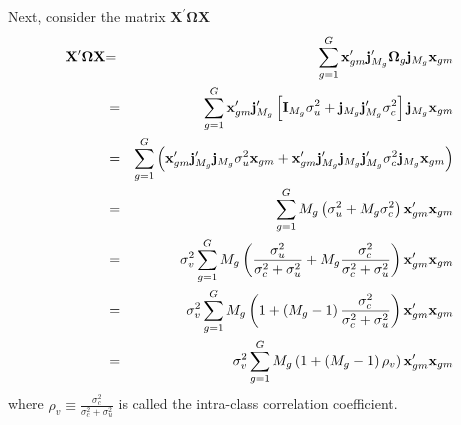 \documentclass{article}
\begin{document}
Next, consider the matrix $\mathbf{X}^{\prime }\mathbf{\Omega X}$%
\begin{eqnarray}
\mathbf{X}^{\prime }\mathbf{\Omega X} &\mathbf{=}&\sum_{g=1}^{G}\mathbf{x}%
_{gm}^{\prime }\mathbf{j}_{M_{g}}^{\prime }\mathbf{\Omega }_{g}\mathbf{j}%
_{M_{g}}\mathbf{x}_{gm}  \notag \\
&=&\sum_{g=1}^{G}\mathbf{x}_{gm}^{\prime }\mathbf{j}_{M_{g}}^{\prime }\left[ 
\mathbf{I}_{M_{g}}\sigma _{u}^{2}+\mathbf{j}_{M_{g}}\mathbf{j}%
_{M_{g}}^{\prime }\sigma _{c}^{2}\right] \mathbf{j}_{M_{g}}\mathbf{x}_{gm} 
\notag \\
&=&\sum_{g=1}^{G}\left( \mathbf{x}_{gm}^{\prime }\mathbf{j}_{M_{g}}^{\prime }%
\mathbf{j}_{M_{g}}\sigma _{u}^{2}\mathbf{x}_{gm}+\mathbf{x}_{gm}^{\prime }%
\mathbf{j}_{M_{g}}^{\prime }\mathbf{j}_{M_{g}}\mathbf{j}_{M_{g}}^{\prime
}\sigma _{c}^{2}\mathbf{j}_{M_{g}}\mathbf{x}_{gm}\right)  \notag \\
&=&\sum_{g=1}^{G}M_{g}\left( \sigma _{u}^{2}+M_{g}\sigma _{c}^{2}\right) 
\mathbf{x}_{gm}^{\prime }\mathbf{x}_{gm}  \notag \\
&=&\sigma _{v}^{2}\sum_{g=1}^{G}M_{g}\left( \frac{\sigma _{u}^{2}}{\sigma
_{c}^{2}+\sigma _{u}^{2}}+M_{g}\frac{\sigma _{c}^{2}}{\sigma _{c}^{2}+\sigma
_{u}^{2}}\right) \mathbf{x}_{gm}^{\prime }\mathbf{x}_{gm}  \notag \\
&=&\sigma _{v}^{2}\sum_{g=1}^{G}M_{g}\left( 1+\left( M_{g}-1\right) \frac{%
\sigma _{c}^{2}}{\sigma _{c}^{2}+\sigma _{u}^{2}}\right) \mathbf{x}%
_{gm}^{\prime }\mathbf{x}_{gm}  \notag \\
&=&\sigma _{v}^{2}\sum_{g=1}^{G}M_{g}\left( 1+\left( M_{g}-1\right) \rho
_{v}\right) \mathbf{x}_{gm}^{\prime }\mathbf{x}_{gm}  \label{X'OMEGAX}
\end{eqnarray}%
where $\rho _{v}\equiv \frac{\sigma _{c}^{2}}{\sigma _{c}^{2}+\sigma _{u}^{2}%
}$ is called the intra-class correlation coefficient.
\end{document}
